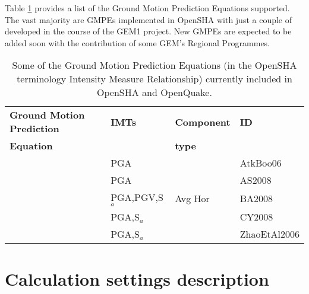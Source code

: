 Table \ref{tab:OQ_GMPEs} provides a list of the Ground Motion Prediction Equations supported. The vast majority are GMPEs implemented in OpenSHA with just a couple of developed in the course of the GEM1 project. New GMPEs are expected to be added soon with the contribution of some GEM's Regional Programmes.
%
\begin{table}[!t]
\centering
\begin{tabular}{llll} \hline
\textbf{Ground Motion Prediction} & \textbf{IMTs} & \textbf{Component } & \textbf{ID} \\
\textbf{Equation}& & \textbf{type} & \\ 
\hline
\cite{atkinson2006} & PGA & & AtkBoo06 \\
\cite{abrahamson2008} & PGA & & AS2008 \\
\cite{boore2008}  & PGA,PGV,S$_{a}$ & Avg Hor & BA2008 \\
\cite{chiou2008}  & PGA,S$_{a}$ &  & CY2008 \\
\cite{zhao2006}  & PGA,S$_{a}$ &  & ZhaoEtAl2006 \\
\hline
\end{tabular}
\caption{Some of the Ground Motion Prediction Equations (in the OpenSHA 
terminology Intensity Measure Relationship) currently included in OpenSHA 
and OpenQuake.}
\label{tab:OQ_GMPEs}
\end{table}
%
%
\section{Calculation settings description}
\label{hazard:calculation_settings}
%



